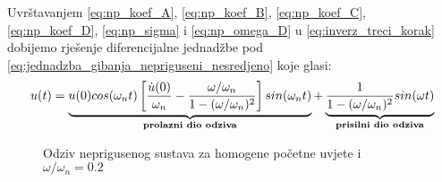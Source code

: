 Uvrštavanjem \eqref{eq:np_koef_A}, \eqref{eq:np_koef_B}, \eqref{eq:np_koef_C},
\eqref{eq:np_koef_D}, \eqref{eq:np_sigma} i \eqref{eq:np_omega_D} u  \eqref{eq:inverz_treci_korak}
dobijemo rješenje diferencijalne jednadžbe pod
\eqref{eq:jednadzba_gibanja_nepriguseni_nesredjeno} 
koje glasi:
\begin{equation}
	u(t)=\underbrace{
            u(0)cos(\omega_n t)
	\left[
		\frac{\dot{u}(0)}{\omega_n}-\frac{\omega/\omega_n}{1-(\omega/\omega_n)^2}
        \right]sin(\omega_n t)\\
	}_{\text{\textbf{prolazni dio odziva}}}
        +
	\underbrace{
		\frac{1}{1-(\omega/\omega_n)^2} sin(\omega t)
	}_{\text{\textbf{prisilni dio odziva}}}
\end{equation}

\begin{figure}[H]
    
    \label{fig:odziv-nepriguseno}
    \caption{Odziv neprigusenog sustava za homogene početne uvjete i
    $\omega/\omega_n=0.2$}
\end{figure}
\newpage


